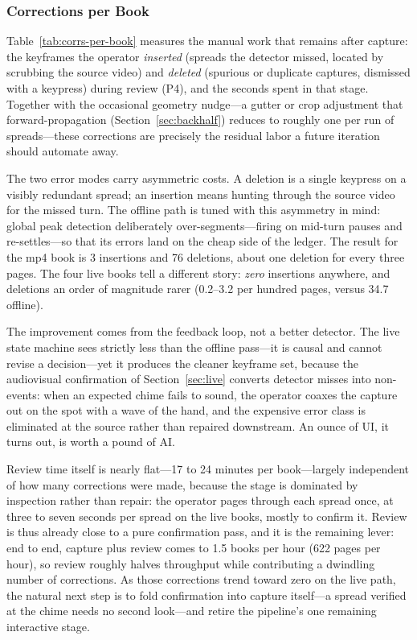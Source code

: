 \documentclass{article}
\begin{document}
\subsubsection{Corrections per Book}
\label{sec:eval-corrections}

Table~\ref{tab:corrs-per-book} measures the manual work that remains after
capture: the keyframes the operator \emph{inserted} (spreads the detector
missed, located by scrubbing the source video) and \emph{deleted} (spurious or
duplicate captures, dismissed with a keypress) during review (P4), and the
seconds spent in that stage. Together with the occasional geometry nudge---a
gutter or crop adjustment that forward-propagation
(Section~\ref{sec:backhalf}) reduces to roughly one per run of spreads---these
corrections are precisely the residual labor a future iteration should
automate away.

The two error modes carry asymmetric costs. A deletion is a single keypress on
a visibly redundant spread; an insertion means hunting through the source
video for the missed turn. The offline path is tuned with this asymmetry in
mind: global peak detection deliberately over-segments---firing on mid-turn
pauses and re-settles---so that its errors land on the cheap side of the
ledger. The result for the mp4 book is 3 insertions and 76 deletions, about
one deletion for every three pages. The four live books tell a different
story: \emph{zero} insertions anywhere, and deletions an order of magnitude
rarer (0.2--3.2 per hundred pages, versus 34.7 offline).

The improvement comes from the feedback loop, not a better detector. The live
state machine sees strictly less than the offline pass---it is causal and
cannot revise a decision---yet it produces the cleaner keyframe set, because
the audiovisual confirmation of Section~\ref{sec:live} converts detector
misses into non-events: when an expected chime fails to sound, the operator
coaxes the capture out on the spot with a wave of the hand, and the expensive
error class is eliminated at the source rather than repaired downstream. An
ounce of UI, it turns out, is worth a pound of AI.

Review time itself is nearly flat---17 to 24 minutes per book---largely
independent of how many corrections were made, because the stage is dominated
by inspection rather than repair: the operator pages through each spread once,
at three to seven seconds per spread on the live books, mostly to confirm it.
Review is thus already close to a pure confirmation pass, and it is the
remaining lever: end to end, capture plus review comes to 1.5 books per hour
(622 pages per hour), so review roughly halves throughput while contributing a
dwindling number of corrections. As those corrections trend toward zero on the
live path, the natural next step is to fold confirmation into capture
itself---a spread verified at the chime needs no second look---and retire the
pipeline's one remaining interactive stage.



\end{document}
